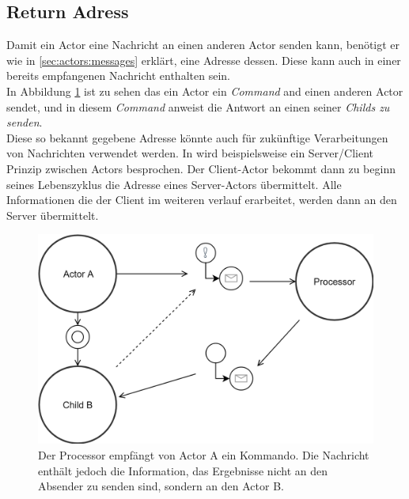 
\subsection{Return Adress}
Damit ein Actor eine Nachricht an einen anderen Actor senden kann, benötigt er wie in \ref{sec:actors:messages} erklärt, eine Adresse dessen. Diese kann auch in einer bereits empfangenen Nachricht enthalten sein. \\
In Abbildung \ref{fig:actor:patterns:returnAdress} ist zu sehen das ein Actor ein \textit{Command} and einen anderen Actor sendet, und in diesem \textit{Command} anweist die Antwort an einen seiner \textit{Childs zu senden}. \\
Diese so bekannt gegebene Adresse könnte auch für zukünftige Verarbeitungen von Nachrichten verwendet werden. In \cite{Vernon2015ReactiveAkka} wird beispielsweise ein Server/Client Prinzip zwischen Actors besprochen. Der Client-Actor bekommt dann zu beginn seines Lebenszyklus die Adresse eines Server-Actors übermittelt. Alle Informationen die der Client im weiteren verlauf erarbeitet, werden dann an den Server übermittelt.

\begin{figure}
    \centering
    \includegraphics[width=\linewidth]{gfx/actor/patterns/returnAddress}
    \caption{Der Processor empfängt von Actor A ein Kommando. Die Nachricht enthält jedoch die Information, das Ergebnisse nicht an den Absender zu senden sind, sondern an den Actor B.}
    \label{fig:actor:patterns:returnAdress}
\end{figure}


